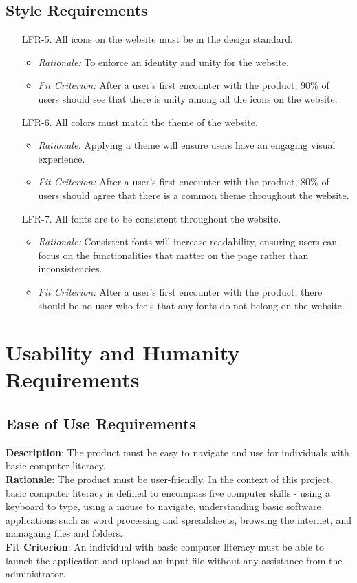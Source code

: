 \documentclass[12pt]{article}
\begin{document}
\subsection{Style Requirements}
\begin{enumerate}
  \item[LFR-5.] All icons on the website must be in the design standard. 
  \begin{itemize}
    \item \textit{Rationale:} To enforce an identity and unity for the website. 
    \item \textit{Fit Criterion:} After a user's first encounter with the product, 90\% of users should
    see that there is unity among all the icons on the website. 
  \end{itemize}
  
  \item[LFR-6.] All colors must match the theme of the website.
  \begin{itemize}
    \item \textit{Rationale:} Applying a theme will ensure users have
    an engaging visual experience.
    \item \textit{Fit Criterion:} After a user's first encounter with the product, 80\% of users
    should agree that there is a common theme throughout the website.
  \end{itemize}
  
  \item[LFR-7.] All fonts are to be consistent throughout the website. 
  \begin{itemize}
    \item \textit{Rationale:} Consistent fonts will increase readability,
    ensuring users can focus on the functionalities that matter on the page rather than inconsistencies. 
    \item \textit{Fit Criterion:} After a user's first encounter with the product, there should
    be no user who feels that any fonts do not belong on the website. 
  \end{itemize}
\end{enumerate}


\section{Usability and Humanity Requirements}
\subsection{Ease of Use Requirements}
\textbf{Description}: The product must be easy to navigate and use for individuals with basic computer literacy.\\
\textbf{Rationale}: The product must be user-friendly. In the context of this project, basic computer literacy is defined to encompass five computer skills - using a keyboard
to type, using a mouse to navigate, understanding basic software applications such as word processing and spreadsheets, browsing the internet, and managaing files and folders.\\ 
\textbf{Fit Criterion}: An individual with basic computer literacy must be able to launch the application and upload an input file without any assistance from the administrator.
\end{document}
